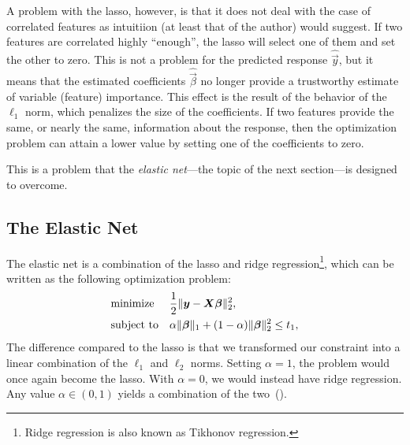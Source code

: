 A problem with the lasso, however, is that it does not deal with the case of correlated features as intuitiion (at least that of the author) would suggest. If two features are correlated highly ``enough'', the lasso will select one of them and set the other to zero. This is not a problem for the predicted response \(\hat{\vec{y}}\), but it means that the estimated coefficients \(\hat{\vec{\beta}}\) no longer provide a trustworthy estimate of variable (feature) importance. This effect is the result of the behavior of the \(\ell_1\) norm, which penalizes the size of the coefficients. If two features provide the same, or nearly the same, information about the response, then the optimization problem can attain a lower value by setting one of the coefficients to zero.

This is a problem that the \emph{elastic net}---the topic of the next section---is designed to overcome.

\subsection{The Elastic Net}

The elastic net is a combination of the lasso and ridge regression\footnote{Ridge regression is also known as Tikhonov regression.}, which can be written as the following optimization problem:
\[
  \begin{aligned}
     & \text{minimize}   &  & \frac{1}{2} \lVert \boldsymbol{y} - \boldsymbol{X}\boldsymbol{\beta}\rVert^2_2,                             \\
     & \text{subject to} &  & \alpha \lVert \boldsymbol{\beta} \rVert_1 + (1-\alpha) \lVert \boldsymbol{\beta}\rVert_2^2 \leq t_1, \\
  \end{aligned}
\]
The difference compared to the lasso is that we transformed our constraint into a linear combination of the \(\ell_1\) and \(\ell_2\) norms. Setting \(\alpha = 1\), the problem would once again become the lasso. With \(\alpha = 0\), we would instead have ridge regression. Any value \(\alpha \in (0, 1)\) yields a combination of the two~().

